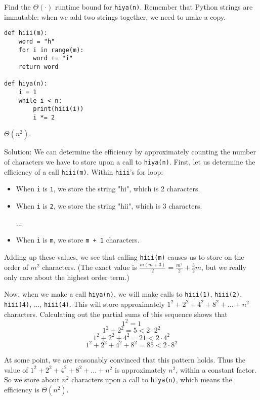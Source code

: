 \begin{blocksection}
\question Find the $\Theta(\cdot)$ runtime bound for \lstinline$hiya(n)$.  Remember that Python strings are immutable: when we add two strings together, we need to make a copy.

\begin{lstlisting}
def hiii(m):
    word = "h"
    for i in range(m):
        word += "i"
    return word

def hiya(n):
    i = 1
    while i < n:
        print(hiii(i))
        i *= 2
\end{lstlisting}
\end{blocksection}

\begin{solution}
$\Theta(n^2)$.

Solution: 
We can determine the efficiency by approximately counting the number of characters we have to store upon a call to \lstinline{hiya(n)}. First, let us determine the efficiency of a call \lstinline{hiii(m)}. Within \lstinline{hiii}'s for loop: 
\begin{itemize}
    \item When \lstinline{i} is \lstinline{1}, we store the string "hi", which is 2 characters.
    \item When \lstinline{i} is \lstinline{2}, we store the string "hii", which is 3 characters. 

    ...
    \item When \lstinline{i} is \lstinline{m}, we store \lstinline{m + 1} characters. 
\end{itemize}

Adding up these values, we see that calling \lstinline{hiii(m)} causes us to store on the order of $m^2$ characters. (The exact value is $\frac{m(m+3)}{2} = \frac{m^2}2 + \frac{3}2 m$, but we really only care about the highest order term.)

Now, when we make a call \lstinline{hiya(n)}, we will make calls to \lstinline{hiii(1)}, \lstinline{hiii(2)}, \lstinline{hiii(4)}, ..., \lstinline{hiii(4)}. This will store approximately $1^2 + 2^2 + 4^2 + 8^2 + ... + n^2$ characters. Calculating out the partial sums of this sequence shows that
$$1^2 = 1$$
$$1^2 + 2^2 = 5 < 2\cdot 2^2$$
$$1^2 + 2^2 + 4^2 = 21 < 2\cdot 4^2$$
$$1^2 + 2^2 + 4^2 + 8^2 = 85 < 2\cdot 8^2$$

At some point, we are reasonably convinced that this pattern holds. Thus the value of $1^2 + 2^2 + 4^2 + 8^2 + ... + n^2$ is approximately $n^2$, within a constant factor. So we store about $n^2$ characters upon a call to \lstinline{hiya(n)}, which means the efficiency is $\Theta(n^2)$. 
\end{solution}